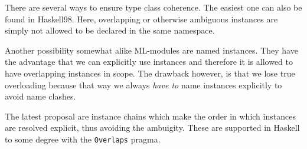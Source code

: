 There are several ways to ensure type class coherence.
The easiest one can also be found in Haskell98.
Here, overlapping or otherwise ambiguous instances are simply not allowed to be declared in the same namespace. 

Another possibility somewhat alike ML-modules are named instances.
They have the advantage that we can explicitly use instances and therefore it is allowed to have overlapping instances in scope.
The drawback however, is that we lose true overloading because that way we always \emph{have to} name instances explicitly to avoid name clashes.

The latest proposal are instance chains which make the order in which instances are resolved explicit, thus avoiding the ambuigity. \cite{morris2010instance}
These are supported in Haskell to some degree with the \texttt{Overlaps} pragma.
